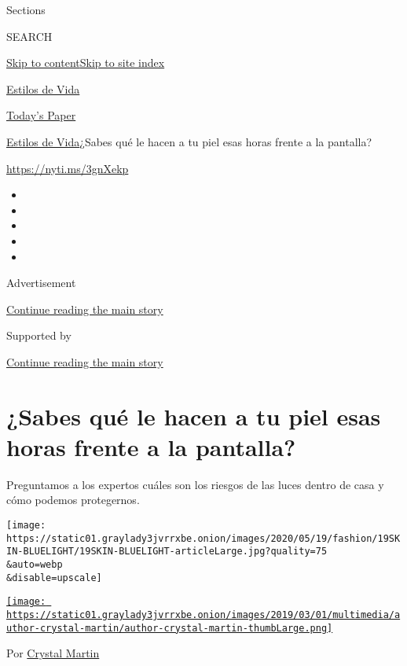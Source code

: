 Sections

SEARCH

\protect\hyperlink{site-content}{Skip to
content}\protect\hyperlink{site-index}{Skip to site index}

\href{https://www.nytimes3xbfgragh.onion/es/section/estilos-de-vida}{Estilos
de Vida}

\href{https://myaccount.nytimes3xbfgragh.onion/auth/login?response_type=cookie\&client_id=vi}{}

\href{https://www.nytimes3xbfgragh.onion/section/todayspaper}{Today's
Paper}

\href{/es/section/estilos-de-vida}{Estilos de Vida}\textbar{}¿Sabes qué
le hacen a tu piel esas horas frente a la pantalla?

\url{https://nyti.ms/3gnXekp}

\begin{itemize}
\item
\item
\item
\item
\item
\end{itemize}

Advertisement

\protect\hyperlink{after-top}{Continue reading the main story}

Supported by

\protect\hyperlink{after-sponsor}{Continue reading the main story}

\hypertarget{sabes-quuxe9-le-hacen-a-tu-piel-esas-horas-frente-a-la-pantalla}{%
\section{¿Sabes qué le hacen a tu piel esas horas frente a la
pantalla?}\label{sabes-quuxe9-le-hacen-a-tu-piel-esas-horas-frente-a-la-pantalla}}

Preguntamos a los expertos cuáles son los riesgos de las luces dentro de
casa y cómo podemos protegernos.

\texttt{[image: https://static01.graylady3jvrrxbe.onion/images/2020/05/19/fashion/19SKIN-BLUELIGHT/19SKIN-BLUELIGHT-articleLarge.jpg?quality=75\\\&auto=webp\\\&disable=upscale]}

\href{https://www.nytimes3xbfgragh.onion/by/crystal-martin}{\texttt{[image: https://static01.graylady3jvrrxbe.onion/images/2019/03/01/multimedia/author-crystal-martin/author-crystal-martin-thumbLarge.png]}}

Por \href{https://www.nytimes3xbfgragh.onion/by/crystal-martin}{Crystal
Martin}

